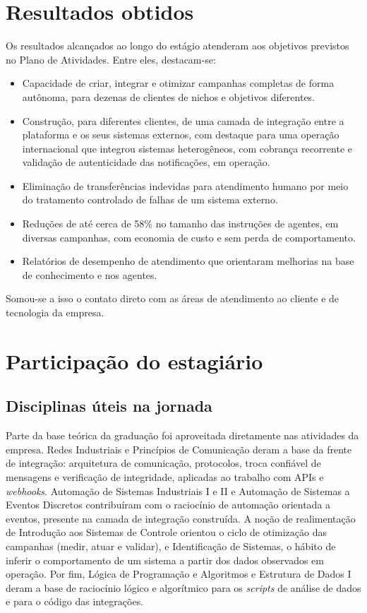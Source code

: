 \documentclass[12pt,a4paper,oneside]{article}
\begin{document}
\section{Resultados obtidos}

Os resultados alcançados ao longo do estágio atenderam aos objetivos previstos no Plano de Atividades. Entre eles, destacam-se:

\begin{itemize}[leftmargin=2em]
  \item Capacidade de criar, integrar e otimizar campanhas completas de forma autônoma, para dezenas de clientes de nichos e objetivos diferentes.
  \item Construção, para diferentes clientes, de uma camada de integração entre a plataforma e os seus sistemas externos, com destaque para uma operação internacional que integrou sistemas heterogêneos, com cobrança recorrente e validação de autenticidade das notificações, em operação.
  \item Eliminação de transferências indevidas para atendimento humano por meio do tratamento controlado de falhas de um sistema externo.
  \item Reduções de até cerca de 58\% no tamanho das instruções de agentes, em diversas campanhas, com economia de custo e sem perda de comportamento.
  \item Relatórios de desempenho de atendimento que orientaram melhorias na base de conhecimento e nos agentes.
\end{itemize}

Somou-se a isso o contato direto com as áreas de atendimento ao cliente e de tecnologia da empresa.

\section{Participação do estagiário}

\subsection{Disciplinas úteis na jornada}

Parte da base teórica da graduação foi aproveitada diretamente nas atividades da empresa. Redes Industriais e Princípios de Comunicação deram a base da frente de integração: arquitetura de comunicação, protocolos, troca confiável de mensagens e verificação de integridade, aplicadas ao trabalho com APIs e \textit{webhooks}. Automação de Sistemas Industriais I e II e Automação de Sistemas a Eventos Discretos contribuíram com o raciocínio de automação orientada a eventos, presente na camada de integração construída. A noção de realimentação de Introdução aos Sistemas de Controle orientou o ciclo de otimização das campanhas (medir, atuar e validar), e Identificação de Sistemas, o hábito de inferir o comportamento de um sistema a partir dos dados observados em operação. Por fim, Lógica de Programação e Algoritmos e Estrutura de Dados I deram a base de raciocínio lógico e algorítmico para os \textit{scripts} de análise de dados e para o código das integrações.
\end{document}
